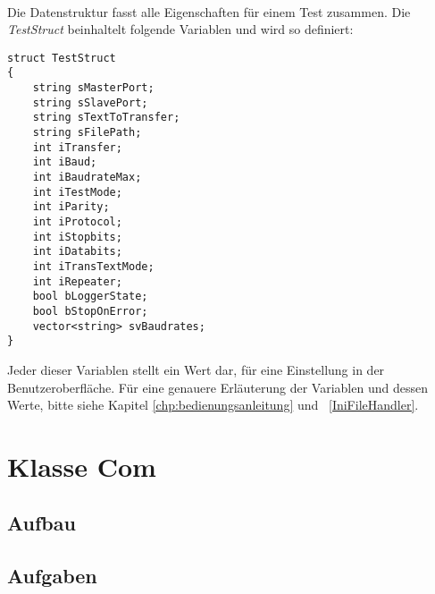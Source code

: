 \paragraph{}
Die Datenstruktur fasst alle Eigenschaften für einem Test zusammen. Die \textit{TestStruct} beinhaltelt folgende Variablen und wird so definiert:\\
\begin{lstlisting}	 
struct TestStruct
{
	string sMasterPort;
	string sSlavePort;
	string sTextToTransfer;
	string sFilePath;
	int iTransfer;
	int iBaud;
	int iBaudrateMax;
	int iTestMode;
	int iParity;
	int iProtocol;
	int iStopbits;
	int iDatabits;
	int iTransTextMode;
	int iRepeater;
	bool bLoggerState;
	bool bStopOnError;
	vector<string> svBaudrates;
}
\end{lstlisting}

Jeder dieser Variablen stellt ein Wert dar, für eine Einstellung in der Benutzeroberfläche. Für eine genauere Erläuterung der Variablen und dessen Werte, bitte siehe Kapitel \ref{chp:bedienungsanleitung} und ~\ref{IniFileHandler}.

\newpage


\section{Klasse Com}
\subsection{Aufbau}
\paragraph{}

\subsection{Aufgaben}

\newpage


